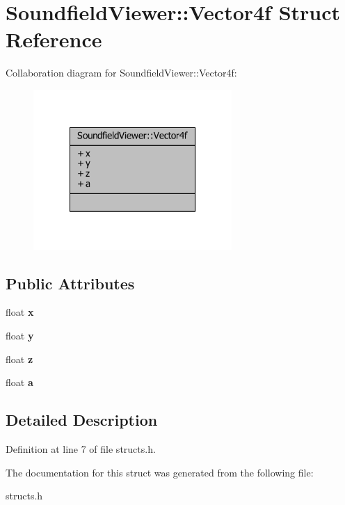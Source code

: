 \section{Soundfield\-Viewer\-:\-:Vector4f Struct Reference}
\label{structSoundfieldViewer_1_1Vector4f}


Collaboration diagram for Soundfield\-Viewer\-:\-:Vector4f\-:\nopagebreak
\begin{figure}[H]
\begin{center}
\leavevmode
\includegraphics[width=214pt]{dc/d7a/structSoundfieldViewer_1_1Vector4f__coll__graph}
\end{center}
\end{figure}
\subsection*{Public Attributes}
\begin{DoxyCompactItemize}
\item 
float {\bfseries x}\label{structSoundfieldViewer_1_1Vector4f_a113f2f7f74856f8811e5ad9e35ceb2f3}

\item 
float {\bfseries y}\label{structSoundfieldViewer_1_1Vector4f_ac85153577ade409cb51e51cb2df5592d}

\item 
float {\bfseries z}\label{structSoundfieldViewer_1_1Vector4f_ac094016896c60174fd59cf4002b56c63}

\item 
float {\bfseries a}\label{structSoundfieldViewer_1_1Vector4f_a00c3a11b646c0de18cfbd8bf6a03e174}

\end{DoxyCompactItemize}


\subsection{Detailed Description}


Definition at line 7 of file structs.\-h.



The documentation for this struct was generated from the following file\-:\begin{DoxyCompactItemize}
\item 
structs.\-h\end{DoxyCompactItemize}
